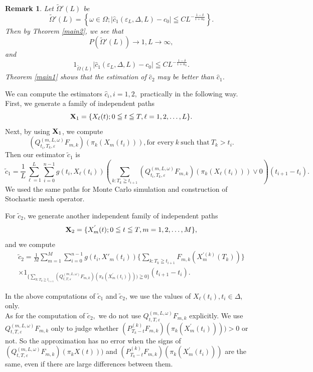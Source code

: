 \documentclass[12pt]{article}
\newtheorem{remark}[thm]{Remark}
\begin{document}
\begin{remark}\label{actual}
Let $\tilde{\Omega}'(L)$ be
$$ \tilde{\Omega}'(L)=\left \{\omega \in \Omega; |\hat{c}_1(\varepsilon_L,\Delta,L) - c_0 | \leqq CL^{-\frac{1-\delta}{1+\alpha_0}} \right\}.$$
Then by Theorem \ref{main2}, we see that
$$
P(\tilde{\Omega}'(L)) \to 1,  L\to \infty,
$$
and
$$1_{\tilde{\Omega}(L) }|\hat{c}_1(\varepsilon_L,\Delta,L)-c_0| \leqq CL^{-\frac{1-\delta}{1+\alpha_0}}.
$$
Theorem \ref{main1} shows that the estimation of $\hat{c}_2$ may be better than $\hat{c}_1$. 
\end{remark}

We can compute the estimators $\hat{c}_i, i=1,2,$ practically in the following way.\\  
\noindent First, we generate a family of independent paths 
$${\bf X}_1 = \{X_{\ell }(t); 0 \leqq t \leqq T, \ell =1,2,\ldots ,L\}.$$
Next, by using ${\bf X}_1$, we compute
$$(Q_{t_i,T_k,\varepsilon}^{(m,L,\omega)}F_{m,k})(\pi_k(X_m(t_i))), \text{for every}\  k \  \text{such that} \ T_k > t_i .$$
Then our estimator $\tilde{c}_1$ is
$$\tilde{c}_1=\frac{1}{L} \sum_{\ell=1}^L \sum_{i=0}^{n-1} g(t_i, X_{\ell}(t_i))( \sum_{k:T_k\geqq t_{i+1}} (Q_{t_i,T_k,\varepsilon}^{(m,L,\omega)}F_{m,k})(\pi_k(X_{\ell}(t_i)))\vee0)(t_{i+1}-t_i). $$
We used the same paths for Monte Carlo simulation and construction  of Stochastic mesh operator. 

For $\tilde{c}_2$, we generate another independent family of independent paths $${\bf X}_2=\{X^{'}_{m }(t); 0 \leqq t \leqq T,  m =1,2,\ldots ,M\},$$
and we compute 
\begin{multline*}
\tilde{c}_2= \frac{1}{M} \sum_{m=1}^M \sum_{i=0}^{n-1} g(t_i, X'_m(t_i)) \{ \sum_{k:T_k\geqq t_{i+1}}F_{m,k}(X_m^{'(k)}(T_k))\}\\
 \times 1_{\{\sum_{k:T_k\geqq t_{i+1}} (Q_{t,T,\varepsilon}^{(m,L,\omega)}F_{m,k})(\pi_k(X^{'}_m(t_i)))) \geqq 0\}}(t_{i+1}-t_i).
 \end{multline*}

In the above computations of $\tilde{c}_1$ and $\tilde{c}_2$, we use the values of $X_{\ell}(t_i), t_i \in \Delta$, only.\\
As for the computation of $\tilde{c}_2,$  we do not use $Q_{t,T,\varepsilon}^{(m,L,\omega)}F_{m,k}$ explicitly.
We use $Q_{t,T,\varepsilon}^{(m,L,\omega)}F_{m,k}$ only to judge whether $(P^{(k)}_{T_k-t} F_{m,k})(\pi_k(X^{'}_m(t_i))))>0$ or not. 
 So the approximation has no error when the signs of  $(Q_{t,T,\varepsilon}^{(m,L,\omega)} F_{m,k})(\pi_k{X}(t)))$ and $(P^{(k)}_{T_k-t} F_{m,k})(\pi_k(X^{'}_m(t_i)))$ are the same, even if there are large differences between them.
\end{document}
